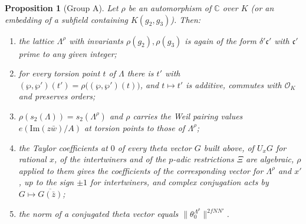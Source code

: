 \documentclass[11pt]{article}
\newtheorem{proposition}[theorem]{Proposition}
\theoremstyle{remark}
\begin{document}
\begin{proposition}[Group A]\label{prop:f4a}
Let $\rho$ be an automorphism of $\mathbb C$ over $K$ (or an embedding of a subfield containing $K(g_2,g_3)$). Then:
\begin{enumerate}[label=(\roman*),nosep]
\item the lattice $\Lambda^\rho$ with invariants $\rho(g_2),\rho(g_3)$ is again of the form $\delta'\mathfrak c'$ with $\mathfrak c'$ prime to any given integer;
\item for every torsion point $t$ of $\Lambda$ there is $t'$ with $(\wp,\wp')(t')=\rho\bigl((\wp,\wp')(t)\bigr)$, and $t\mapsto t'$ is additive, commutes with $\mathcal O_K$ and preserves orders;
\item $\rho(s_2(\Lambda))=s_2(\Lambda^\rho)$ and $\rho$ carries the Weil pairing values $e(\mathrm{Im}(z\bar w)/A)$ at torsion points to those of $\Lambda^\rho$;
\item the Taylor coefficients at $0$ of every theta vector $G$ built above, of $U_xG$ for rational $x$, of the intertwiners and of the $p$-adic restrictions $\Xi$ are algebraic, $\rho$ applied to them gives the coefficients of the corresponding vector for $\Lambda^\rho$ and $x'$, up to the sign $\pm1$ for intertwiners, and complex conjugation acts by $G\mapsto\overline{G(\bar z)}$;
\item the norm of a conjugated theta vector equals $\lVert\theta_0^{\Lambda^\rho}\rVert^{2fNN'}$.
\end{enumerate}
\end{proposition}
\end{document}
